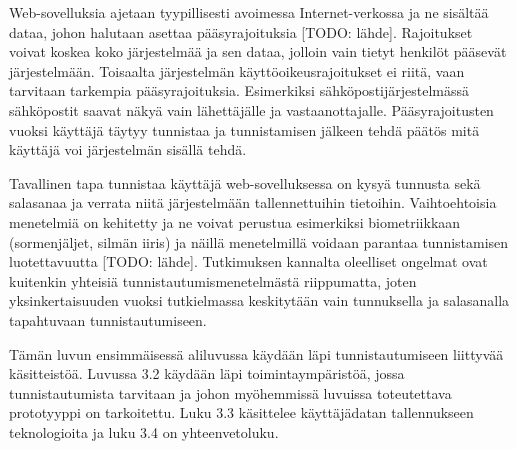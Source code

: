 Web-sovelluksia ajetaan tyypillisesti avoimessa Internet-verkossa ja ne sisältää dataa, johon halutaan asettaa pääsyrajoituksia [TODO: lähde]. Rajoitukset voivat koskea koko järjestelmää ja sen dataa, jolloin vain tietyt henkilöt pääsevät järjestelmään. Toisaalta järjestelmän käyttöoikeusrajoitukset ei riitä, vaan tarvitaan tarkempia pääsyrajoituksia. Esimerkiksi sähköpostijärjestelmässä sähköpostit saavat näkyä vain lähettäjälle ja vastaanottajalle. Pääsyrajoitusten vuoksi käyttäjä täytyy tunnistaa ja tunnistamisen jälkeen tehdä päätös mitä käyttäjä voi järjestelmän sisällä tehdä.

Tavallinen tapa tunnistaa käyttäjä web-sovelluksessa on kysyä tunnusta sekä salasanaa ja verrata niitä järjestelmään tallennettuihin tietoihin. Vaihtoehtoisia menetelmiä on kehitetty ja ne voivat perustua esimerkiksi biometriikkaan (sormenjäljet, silmän iiris) ja näillä menetelmillä voidaan parantaa tunnistamisen luotettavuutta [TODO: lähde]. Tutkimuksen kannalta oleelliset ongelmat ovat kuitenkin yhteisiä tunnistautumismenetelmästä riippumatta, joten yksinkertaisuuden vuoksi tutkielmassa keskitytään vain tunnuksella ja salasanalla tapahtuvaan tunnistautumiseen.

Tämän luvun ensimmäisessä aliluvussa käydään läpi tunnistautumiseen liittyvää käsitteistöä. Luvussa 3.2 käydään läpi toimintaympäristöä, jossa tunnistautumista tarvitaan ja johon myöhemmissä luvuissa toteutettava prototyyppi on tarkoitettu. Luku 3.3 käsittelee käyttäjädatan tallennukseen teknologioita ja luku 3.4 on yhteenvetoluku.